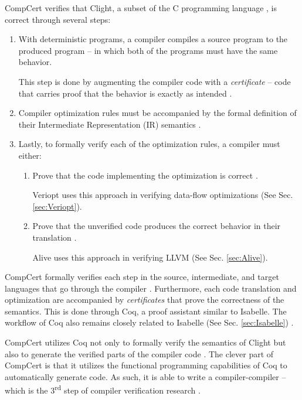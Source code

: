 CompCert verifies that Clight, a subset of the C programming language \cite{compcertVerification}, is correct through several steps:
\begin{enumerate}
    \item 
    With deterministic programs, a compiler compiles a source program to the produced program -- in which both of the programs must have 
    the same behavior.
    
    This step is done by augmenting the compiler code with a \emph{certificate} -- code that carries proof that the behavior is exactly as intended 
    \cite[Sec. 2.2]{compcertVerification}.

    \item Compiler optimization rules must be accompanied by the formal definition of their Intermediate Representation (IR) semantics 
          \cite{compcertVerification,ATVA21_GraalVM_IR_Semantics}.
    
    \item Lastly, to formally verify each of the optimization rules, a compiler must either:
    \begin{enumerate}
        \item
        Prove that the code implementing the optimization is correct \cite[Sec. 2.4]{compcertVerification}.
        
        Veriopt uses this approach in verifying data-flow optimizations (See Sec. \ref{sec:Veriopt}).

        \item 
        Prove that the unverified code produces the correct behavior in their translation \cite[Sec. 2.4]{compcertVerification}.

        Alive uses this approach in verifying LLVM (See Sec. \ref{sec:Alive}).
    \end{enumerate}
\end{enumerate}

CompCert formally verifies each step in the source, intermediate, and target languages that go through the compiler 
\cite[Sec. 3.3]{compcertVerification}. Furthermore, each code translation and optimization are accompanied by \emph{certificates} that prove 
the correctness of the semantics. This is done through Coq, a proof assistant similar to Isabelle. The workflow of Coq also remains closely related to 
Isabelle (See Sec. \ref{sec:Isabelle}) \cite[Sec. 3.3]{compcertVerification}. 

CompCert utilizes Coq not only to formally verify the semantics of Clight but also to generate the verified parts of the compiler code 
\cite[Sec. 3.4]{compcertVerification}. The clever part of CompCert is that it utilizes the functional programming capabilities of Coq 
to automatically generate code. As such, it is able to write a compiler-compiler -- which is the 3\textsuperscript{rd} step of compiler verification research 
\cite{CompilerOptimization}.

